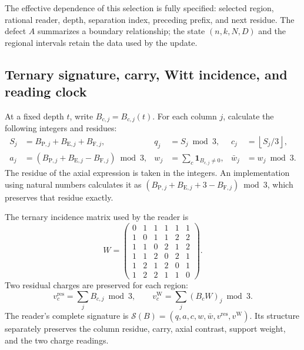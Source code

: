 The effective dependence of this selection is fully specified:
selected region, rational reader, depth, separation index, preceding
prefix, and next residue. The defect \(A\) summarizes a boundary
relationship; the state \((n,k,N,D)\) and the regional intervals retain
the data used by the update.

\subsection{Ternary signature, carry, Witt incidence, and reading clock}
\label{act21:subsec:df-firma-conjunta}


At a fixed depth \(t\), write \(B_{c,j}=B_{c,j}(t)\). For each column
\(j\), calculate the following integers and residues:
\begin{align}
 S_j&=B_{\mathrm P,j}+B_{\mathrm E,j}+B_{\mathrm F,j},
 &q_j&=S_j\bmod3,
 &c_j&=\left\lfloor S_j/3\right\rfloor,
 \label{act21:eq:df-firma-qc}\\
 a_j&=(B_{\mathrm P,j}+B_{\mathrm E,j}-B_{\mathrm F,j})\bmod3,
 &w_j&=\sum_c\mathbf1_{B_{c,j}\ne0},
 &\bar w_j&=w_j\bmod3.
 \label{act21:eq:df-firma-axial}
\end{align}
The residue of the axial expression is taken in the integers. An
implementation using natural numbers calculates it as
\((B_{\mathrm P,j}+B_{\mathrm E,j}+3-B_{\mathrm F,j})\bmod3\),
which preserves that residue exactly.

The ternary incidence matrix used by the reader is
\begin{equation}
 W=\begin{pmatrix}
0&1&1&1&1&1\\
1&0&1&1&2&2\\
1&1&0&2&1&2\\
1&1&2&0&2&1\\
1&2&1&2&0&1\\
1&2&2&1&1&0
\end{pmatrix}.
\label{act21:eq:df-matriz-witt}
\end{equation}
Two residual charges are preserved for each region:
\begin{equation}
 v_c^{\mathrm{res}}=\sum_j B_{c,j}\bmod3,
 \qquad
 v_c^{\mathrm W}=\sum_j(B_cW)_j\bmod3.
 \label{act21:eq:df-cargas-residuales}
\end{equation}
The reader's complete signature is
\(\mathcal S(B)=(q,a,c,w,\bar w,v^{\mathrm{res}},v^{\mathrm W})\).
Its structure separately preserves the column residue, carry, axial
contrast, support weight, and the two charge readings.

